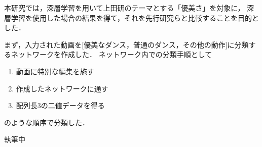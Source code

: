 本研究では，深層学習を用いて上田研のテーマとする「優美さ」を対象に，
深層学習を使用した場合の結果を得て，それを先行研究らと比較することを目的とした．

まず，入力された動画を[優美なダンス，普通のダンス，その他の動作]に分類するネットワークを作成した．
ネットワーク内での分類手順として
\begin{enumerate}
  \item 動画に特別な編集を施す
  \item 作成したネットワークに通す
  \item 配列長3の二値データを得る
\end{enumerate}
のような順序で分類した．

執筆中